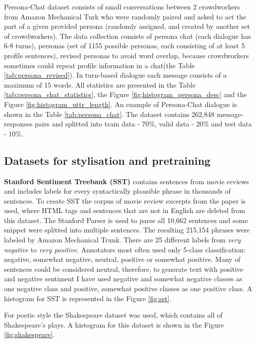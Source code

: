 Persona-Chat dataset consists of small conversations between 2 crowdworkers from Amazon Mechanical Turk who were randomly paired and asked to act the part of a given provided persona (randomly assigned, and created by another set of crowdworkers). The data collection consists of persona chat (each dialogue has 6-8 turns), personas (set of 1155 possible personas, each consisting of at least 5 profile sentences), revised personas to avoid word overlap, because crowdworkers sometimes could repeat profile information in a chat(the Table \ref{tab:persona_revised}). In turn-based dialogue each message consists of a maximum of 15 words. All statistics are presented in the Table \ref{tab:persona_chat_statistics}, the Figure \ref{fig:histogram_persona_desc} and the Figure \ref{fig:histogram_uttr_length}. An example of Persona-Chat dialogue is shown in the Table \ref{tab:persona_chat}. The dataset contains 262,848 message-responses pairs and splitted into train data - 70\%, valid data - 20\% and test data - 10\%.

\subsection{Datasets for stylisation and pretraining} \label{stylistic_dataset_section}
\textbf{Stanford Sentiment Treebank (SST)} contains sentences from movie reviews and includes labels for every syntactically plausible phrase in thousands of sentences. To create SST the corpus of movie review excerpts from the paper \cite{pang2005seeing} is used, where HTML tags and sentences that are not in English are deleted from this dataset. The Stanford Parser is used to parse all 10,662 sentences and some snippet were splitted into multiple sentences. The resulting 215,154 phrases were labeled by Amazon Mechanical Trunk. There are 25 different labels from \textit{very negative} to \textit{very positive}. Annotators most often used only 5-class classification: negative, somewhat negative, neutral, positive or somewhat positive. Many of sentences could be considered neutral, therefore, to generate text with positive and negative sentiment I have used negative and somewhat negative classes as one negative class and positive, somewhat positive classes as one positive class. A histogram for SST is represented in the Figure \ref{fig:sst}.

For poetic style the Shakespeare dataset was used, which contains all of Shakespeare's plays. A histogram for this dataset is shown in the Figure \ref{fig:shakespeare}.

